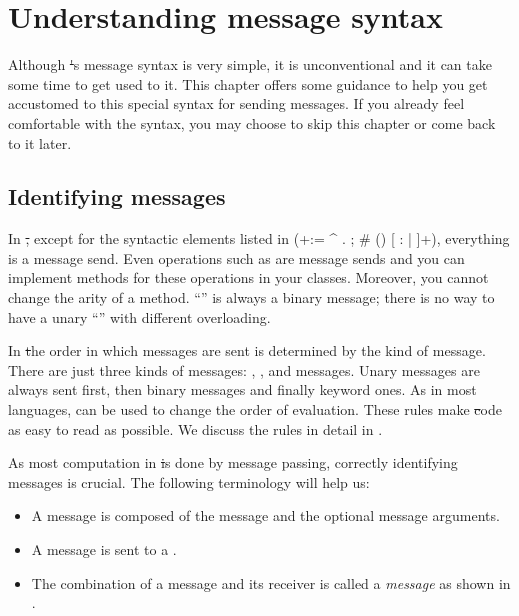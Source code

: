 \documentclass[a4paper,10pt,twoside]{book}
\begin{document}
	\renewcommand{\nnbb}[2]{} %
\fi
\chapter{Understanding message syntax}
\label{cha:understanding}

Although \st's message syntax is very simple, it is unconventional and it can take some time to get used to it.
This chapter offers some guidance to help you get accustomed to this special syntax for sending messages.
If you already feel comfortable with the syntax, you may choose to skip this chapter or come back to it later.

\section{Identifying messages}

In \st, except for the syntactic elements listed in  (\ct+:= ^ . ; # () {} [ : | ]+), everything is a message send. 
Even operations such as \ct{+} are message sends and you can implement methods for these operations in your classes.
Moreover, you cannot change the arity of a method.
``\ct{-}'' is always a binary message; there is no way to have a unary ``\ct{-}'' with different overloading.

In \st the order in which messages are sent is determined by the kind of message.
There are just three kinds of messages: , , and  messages.
Unary messages are always sent first, then binary messages and finally keyword ones.
As in most languages,  can be used to change the order of evaluation.
These rules make \st code as easy to read as possible.
We discuss the rules in detail in .

As most computation in \st is done by message passing, correctly identifying messages is crucial.
The following terminology will help us:

\begin{itemize}
  \item A message is composed of the message  and the optional message arguments.
  \item A message is sent to a .
  \item The combination of a message and its receiver is called a \emph{message}  as shown in .
\end{itemize}
\end{document}
